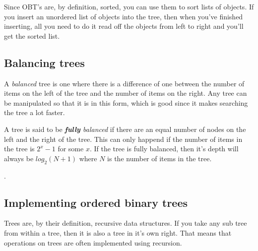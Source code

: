 Since OBT's are, by definition, sorted, you can use them to sort lists of
objects. If you insert an unordered list of objects into the tree, then when
you've finished inserting, all you need to do it read off the objects from left
to right and you'll get the sorted list.

\subsection*{Balancing trees}

A {\it balanced} tree is one where there is a difference of one between the
number of items on the left of the tree and the number of items on the right.
Any tree can be manipulated so that it is in this form, which is good since it
makes searching the tree a lot faster.

A tree is said to be {\it {\bf fully} balanced} if there are an equal number of
nodes on the left and the right of the tree. This can only happend if the number
of items in the tree is $2^x - 1$ for some $x$. If the tree is fully balanced,
then it's depth will always be $log_2(N + 1)$ where $N$ is the number of items
in the tree.

.

\subsection*{Implementing ordered binary trees}

Trees are, by their definition, recursive data structures. If you take any sub
tree from within a tree, then it is also a tree in it's own right. That means
that operations on trees are often implemented using recursion.


